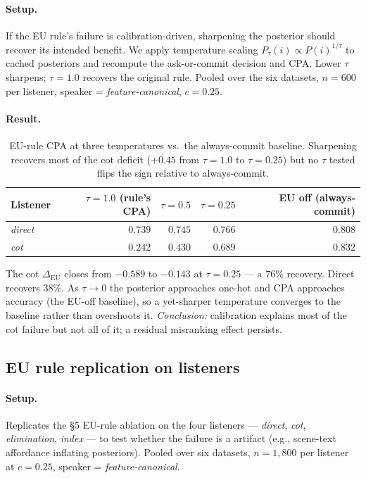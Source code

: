 \documentclass[11pt]{article}
\begin{document}
\paragraph{Setup.} If the EU rule's failure is calibration-driven,
sharpening the posterior should recover its intended benefit. We apply
temperature scaling $P_\tau(i) \propto P(i)^{1/\tau}$ to cached
posteriors and recompute the ask-or-commit decision and CPA. Lower
$\tau$ sharpens; $\tau{=}1.0$ recovers the original rule. Pooled over
the six datasets, $n{=}600$ per listener, speaker =
\textit{feature-canonical}, $c{=}0.25$.

\paragraph{Result.}
\begin{table}[H]
\centering
\small
\setlength{\tabcolsep}{6pt}
\begin{tabular}{lrrrr}
\toprule
Listener & $\tau{=}1.0$ (rule's CPA) & $\tau{=}0.5$ & $\tau{=}0.25$ & EU off (always-commit) \\
\midrule
\textit{direct} & $0.739$ & $0.745$ & $0.766$ & $0.808$ \\
\textit{cot}    & $0.242$ & $0.430$ & $0.689$ & $0.832$ \\
\bottomrule
\end{tabular}
\caption{EU-rule CPA at three temperatures vs.\ the always-commit
baseline. Sharpening recovers most of the cot deficit ($+0.45$ from
$\tau{=}1.0$ to $\tau{=}0.25$) but no $\tau$ tested flips the sign
relative to always-commit.}
\label{tab:b-temperature}
\end{table}

The cot $\Delta_{\text{EU}}$ closes from $-0.589$ to $-0.143$ at
$\tau{=}0.25$ --- a $76\%$ recovery. Direct recovers $38\%$. As
$\tau \to 0$ the posterior approaches one-hot and CPA approaches
accuracy (the EU-off baseline), so a yet-sharper temperature
converges to the baseline rather than overshoots it. \emph{Conclusion:}
calibration explains most of the cot failure but not all of it; a
residual misranking effect persists.

\subsection{EU rule replication on listeners}
\label{app:a5}

\paragraph{Setup.} Replicates the §5 EU-rule ablation on the four
listeners --- \textit{direct}, \textit{cot},
\textit{elimination}, \textit{index} --- to test whether the
failure is a artifact (e.g., scene-text affordance
inflating posteriors). Pooled over six datasets, $n{=}1{,}800$ per
listener at $c{=}0.25$, speaker = \textit{feature-canonical}.
\end{document}
